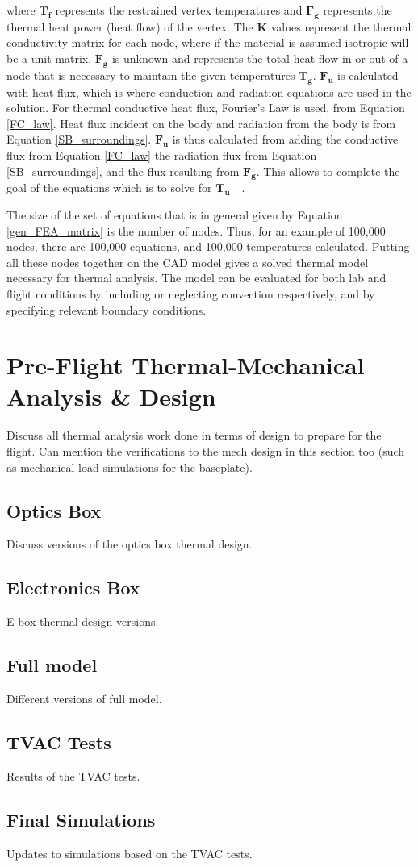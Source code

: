 where $\bm{T_f}$ represents the restrained vertex temperatures and $\bm{F_g}$ represents the thermal heat power (heat flow) of the vertex. The $\bm{K}$ values represent the thermal conductivity matrix for each node, where if the material is assumed isotropic will be a unit matrix. $\bm{F_g}$ is unknown and represents the total heat flow in or out of a node that is necessary to maintain the given temperatures $\bm{T_g}$. $\bm{F_u}$ is calculated with heat flux, which is where conduction and radiation equations are used in the solution. For thermal conductive heat flux, Fourier's Law is used, from Equation \ref{FC_law}. Heat flux incident on the body and radiation from the body is from Equation \ref{SB_surroundings}. $\bm{F_u}$ is thus calculated from adding the conductive flux from Equation \ref{FC_law} the radiation flux from Equation \ref{SB_surroundings}, and the flux resulting from $\bm{F_g}$. This allows to complete the goal of the equations which is to solve for $\bm{T_u}$~\citep{FEA_SW}~\citep{FEA_Procedures}.

The size of the set of equations that is in general given by Equation \ref{gen_FEA_matrix} is the number of nodes. Thus, for an example of 100,000 nodes, there are 100,000 equations, and 100,000 temperatures calculated. Putting all these nodes together on the CAD model gives a solved thermal model necessary for thermal analysis.  The model can be evaluated for both lab and flight conditions by including or neglecting convection respectively, and by specifying relevant boundary conditions. 

\section{Pre-Flight Thermal-Mechanical Analysis \& Design}
Discuss all thermal analysis work done in terms of design to prepare for the flight. Can mention the verifications to the mech design in this section too (such as mechanical load simulations for the baseplate).

\subsection{Optics Box}
Discuss versions of the optics box thermal design.

\subsection{Electronics Box}
E-box thermal design versions.

\subsection{Full model}
Different versions of full model.

\subsection{TVAC Tests}
Results of the TVAC tests.

\subsection{Final Simulations}
Updates to simulations based on the TVAC tests.
